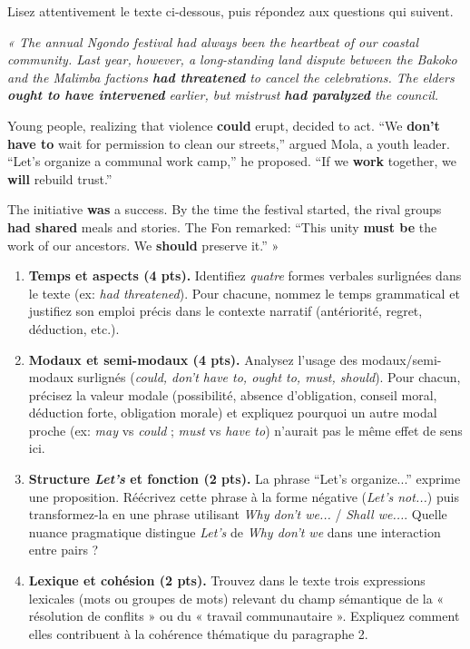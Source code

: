 \documentclass[11pt]{article}
\begin{document}
\begin{exercice}
Lisez attentivement le texte ci-dessous, puis répondez aux questions qui suivent.

{\itshape
« The annual Ngondo festival had always been the heartbeat of our coastal community. Last year, however, a long-standing land dispute between the Bakoko and the Malimba factions \textbf{had threatened} to cancel the celebrations. The elders \textbf{ought to have intervened} earlier, but mistrust \textbf{had paralyzed} the council.

Young people, realizing that violence \textbf{could} erupt, decided to act. ``We \textbf{don't have to} wait for permission to clean our streets,'' argued Mola, a youth leader. ``Let's organize a communal work camp,'' he proposed. ``If we \textbf{work} together, we \textbf{will} rebuild trust.''

The initiative \textbf{was} a success. By the time the festival started, the rival groups \textbf{had shared} meals and stories. The Fon remarked: ``This unity \textbf{must be} the work of our ancestors. We \textbf{should} preserve it.'' »
}

\begin{enumerate}
    \item \textbf{Temps et aspects (4 pts).} Identifiez \textit{quatre} formes verbales surlignées dans le texte (ex: \textit{had threatened}). Pour chacune, nommez le temps grammatical et justifiez son emploi précis dans le contexte narratif (antériorité, regret, déduction, etc.).
    \item \textbf{Modaux et semi-modaux (4 pts).} Analysez l'usage des modaux/semi-modaux surlignés (\textit{could, don't have to, ought to, must, should}). Pour chacun, précisez la valeur modale (possibilité, absence d'obligation, conseil moral, déduction forte, obligation morale) et expliquez pourquoi un autre modal proche (ex: \textit{may} vs \textit{could} ; \textit{must} vs \textit{have to}) n'aurait pas le même effet de sens ici.
    \item \textbf{Structure \textit{Let's} et fonction (2 pts).} La phrase ``Let's organize...'' exprime une proposition. Réécrivez cette phrase à la forme négative (\textit{Let's not...}) puis transformez-la en une phrase utilisant \textit{Why don't we...} / \textit{Shall we...}. Quelle nuance pragmatique distingue \textit{Let's} de \textit{Why don't we} dans une interaction entre pairs ?
    \item \textbf{Lexique et cohésion (2 pts).} Trouvez dans le texte trois expressions lexicales (mots ou groupes de mots) relevant du champ sémantique de la « résolution de conflits » ou du « travail communautaire ». Expliquez comment elles contribuent à la cohérence thématique du paragraphe 2.
\end{enumerate}
\end{exercice}
\end{document}
